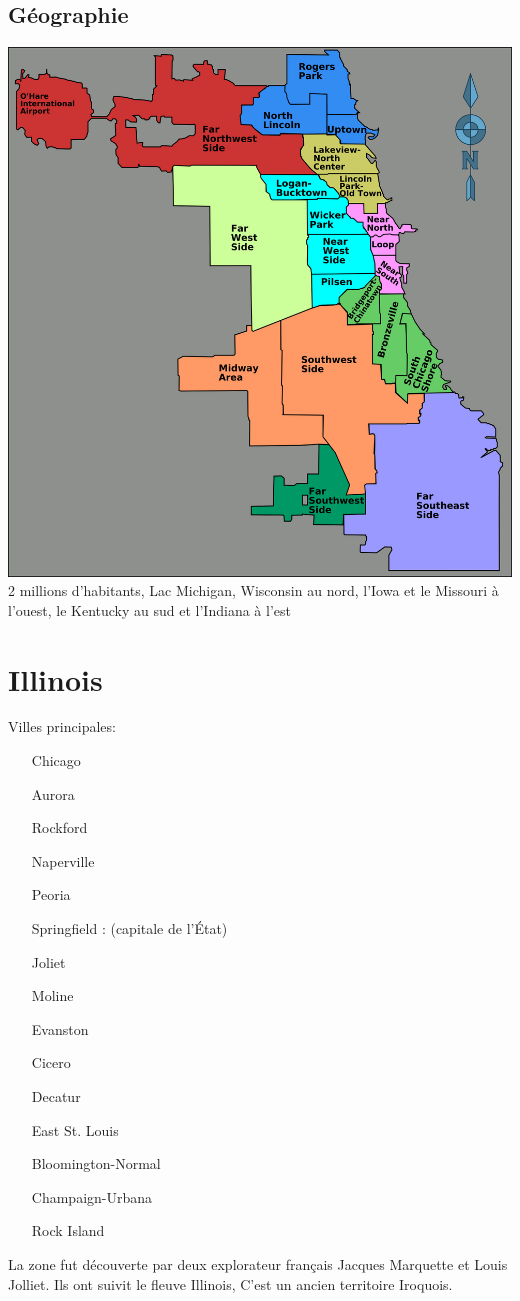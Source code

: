 \documentclass[oneside,12pt]{book}
\begin{document}
\begin{flushleft}
\subsection {Géographie}
\includegraphics[scale=0.5]{chicago.png} \\
       2 millions d'habitants, Lac Michigan, Wisconsin au nord, l'Iowa et le Missouri à l'ouest, le Kentucky au sud et l'Indiana à l'est
	\section*{Illinois}
Villes principales:
\begin{itemize}
\item[Chicago]
\item[Aurora]
\item[Rockford]
\item[Naperville]
\item[Peoria]
\item[Springfield]: (capitale de l'État)
\item[Joliet]
\item[Moline]
\item[Evanston]
\item[Cicero]
\item[Decatur]
\item[East St. Louis]
\item[Bloomington-Normal]
\item[Champaign-Urbana]
\item[Rock Island]
\end{itemize}
La zone fut découverte par deux explorateur français Jacques Marquette et Louis Jolliet. Ils ont suivit le fleuve Illinois, C'est un ancien territoire Iroquois.

\end{flushleft}
\end{document}
